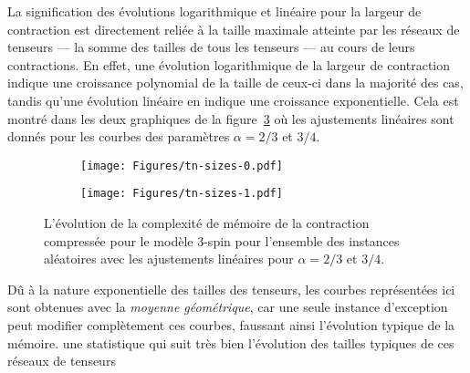 La signification des évolutions logarithmique et linéaire pour la largeur de contraction est directement reliée à la taille maximale atteinte par les réseaux de tenseurs --- la somme des tailles de tous les tenseurs --- au cours de leurs contractions.
En effet, une évolution logarithmique de la largeur de contraction indique une croissance polynomial de la taille de ceux-ci dans la majorité des cas, tandis qu'une évolution linéaire en indique une croissance exponentielle.
Cela est montré dans les deux graphiques de la figure~\ref{fig:tn-sizes} où les ajustements linéaires sont donnés pour les courbes des paramètres $\alpha = 2/3$ et $3/4$.
\begin{figure}[h]
    \centering
    \begin{subfigure}{.49\textwidth}
        \centering
        \texttt{[image: Figures/tn-sizes-0.pdf]}
        \caption{}
        \label{subfig:tn-sizes-0}
    \end{subfigure}
    \hfill
    \begin{subfigure}{.49\textwidth}
        \centering
        \texttt{[image: Figures/tn-sizes-1.pdf]}
        \caption{}
        \label{subfig:tn-sizes-1}
    \end{subfigure}
    \caption{L'évolution de la complexité de mémoire de la contraction compressée pour le modèle $3$-spin pour l'ensemble des instances aléatoires avec les ajustements linéaires pour $\alpha = 2/3$ et $3/4$.}
    \label{fig:tn-sizes}
\end{figure}
Dû à la nature exponentielle des tailles des tenseurs, les courbes représentées ici sont obtenues avec la \emph{moyenne géométrique}, car une seule instance d'exception peut modifier complètement ces courbes, faussant ainsi l'évolution typique de la mémoire.
une statistique qui suit très bien l'évolution des tailles typiques de ces réseaux de tenseurs

